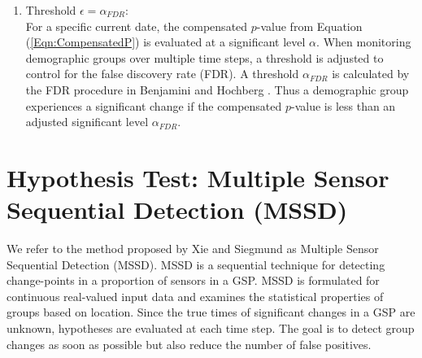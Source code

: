 \begin{enumerate}[4.]
\item Threshold $\epsilon=\alpha_{FDR}$: \\ 
For a specific current date, the compensated $p$-value   from Equation (\ref{Eqn:CompensatedP}) is evaluated at a significant level  $\alpha$.  
When monitoring demographic groups over multiple time steps, a threshold is adjusted to control for the false discovery rate (FDR). A threshold $\alpha_{FDR}$ is calculated by the FDR procedure in  Benjamini  and Hochberg \cite{MultiTest}. Thus a demographic group experiences a significant change if the compensated $p$-value is less than an adjusted significant level $\alpha_{FDR}$. 
\end{enumerate}

\section{Hypothesis Test: Multiple Sensor Sequential Detection (MSSD)}
We refer to the method  proposed by  Xie and Siegmund  \cite{xie2013} as Multiple Sensor Sequential Detection (MSSD). MSSD is a sequential technique for detecting change-points in a proportion of sensors in a GSP. MSSD is formulated for continuous real-valued input data and examines the statistical properties of groups based on  location. Since the true times of significant changes in a GSP are unknown,  hypotheses are evaluated at each time step. The goal is to detect group changes as soon as possible but also reduce the number of false positives. 


